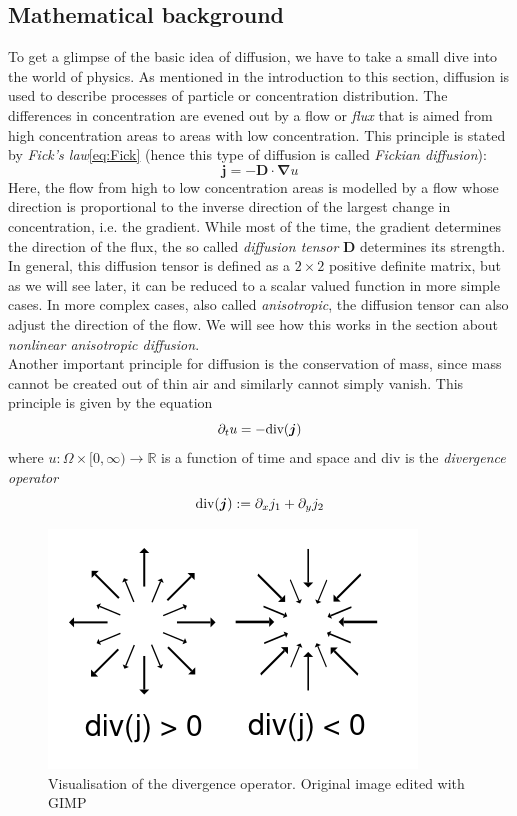 \subsection{Mathematical background}
To get a glimpse of the basic idea of diffusion, we have to take a small dive into the world of
physics.
As mentioned in the introduction to this section, diffusion is used to describe processes of
particle or concentration distribution. The differences in concentration are evened out by a flow
or \textit{flux} that is aimed from high concentration areas to areas with low concentration. This
principle is stated by \textit{Fick's law}\eqref{eq:Fick} (hence this type of diffusion is called \textit{Fickian
diffusion}):
\begin{equation}
    \boldsymbol j = -\boldsymbol D\cdot\boldsymbol\nabla u\label{eq:Fick}
\end{equation}
Here, the flow from high to low concentration areas is modelled by a flow whose direction is
proportional to the inverse direction of the largest change in concentration, i.e. the gradient.
While most of the time, the gradient determines the direction of the flux, the so called
\textit{diffusion tensor} $\boldsymbol D$ determines its strength. In general, this diffusion
tensor is defined as a
$2\times2$ positive definite matrix, but as we will see later, it can be reduced to a scalar 
valued function in more simple cases.
In more complex cases, also called \textit{anisotropic}, the diffusion tensor can also adjust the
direction of the flow. We will see how this works in the section about \textit{nonlinear
anisotropic diffusion}.\\
Another important principle for diffusion is the conservation of mass, since mass cannot be created
out of thin air and similarly cannot simply vanish.
This principle is given by the equation
\begin{equation}
    \partial_t u = - \textnormal{div}(\boldsymbol j)\label{eq:Conservation}
\end{equation}
where $u: \Omega \times [0, \infty) \rightarrow \mathbb{R}$ is a function of time and space and div
is the \textit{divergence operator}
\[\textnormal{div}(\boldsymbol j) := \partial_x j_1 + \partial_y j_2\]
\begin{figure}[h]
    \centering
    \includegraphics[width=0.5\linewidth]{../Images/divergence2.png}
    \caption{Visualisation of the divergence operator. Original image \cite{img-divergence}
    edited with GIMP}\label{fig:Divergence}
\end{figure}
